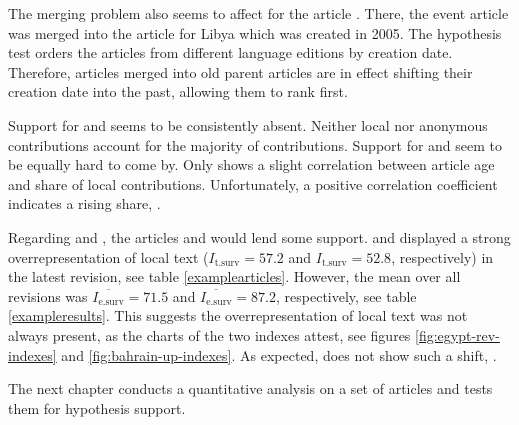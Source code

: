 The merging problem also seems to affect  for the article .
There, the event article was merged into the article for Libya which was created in 2005.
The hypothesis test orders the articles from different language editions by creation date.
Therefore, articles merged into old parent articles are in effect shifting their creation date into the past, allowing them to rank first.

Support for  and   seems to be consistently absent.
Neither local nor anonymous contributions account for the majority of contributions.
Support for  and   seem to be equally hard to come by.
Only  shows a slight correlation between article age and share of local contributions.
Unfortunately, a positive correlation coefficient indicates a rising share, .


Regarding  and , the articles   and  would lend some support.
 and  displayed a strong overrepresentation of local text ($I_{\text{t.surv}} = 57.2$ and $I_{\text{t.surv}} = 52.8$, respectively) in the latest revision, see table \ref{examplearticles}.
However, the mean over all revisions was $\overline{I_{\text{e.surv}}} = 71.5$ and $\overline{I_{\text{e.surv}}} = 87.2$, respectively,  see table \ref{exampleresults}.
This suggests the overrepresentation of local text was not always present, as the charts of the two indexes attest, see figures \ref{fig:egypt-rev-indexes} and \ref{fig:bahrain-up-indexes}.
As expected,  does not show such a shift, .

The next chapter  conducts a quantitative analysis on a set of articles and tests them for hypothesis support.
\clearpage 


 
